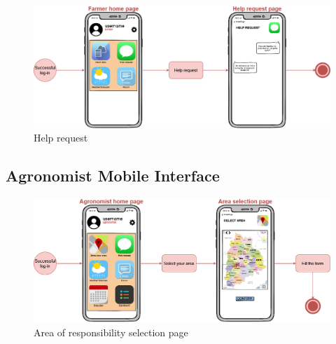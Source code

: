 \begin{center}
    \begin{figure}[H]
        \includegraphics[width=\textwidth]{Images/UserInterface/Diagram/HelpRequestFarmerSide.drawio.png}
        \caption{Help request}
    \end{figure}
\end{center}
\bigskip
\bigskip

\subsection{Agronomist Mobile Interface}
\begin{center}
    \begin{figure}[H]
        \includegraphics[width=\textwidth]{Images/UserInterface/Diagram/selectArea.drawio.png}
        \caption{Area of responsibility selection page}
    \end{figure}
\end{center}
\newpage

